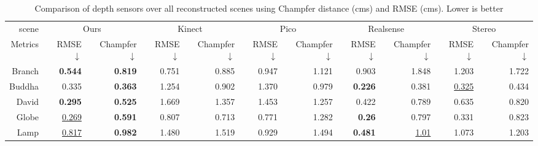 \begin{table*}[t]
    \centering
    \begin{adjustbox}{max width=\linewidth}
    \setlength{\tabcolsep}{4pt}
    {\small
        \begin{tabular}{rrrrrrrrrrr}
        \toprule
        scene  &  \multicolumn{2}{c}{Ours}  &  \multicolumn{2}{c}{Kinect}  &   \multicolumn{2}{c}{Pico}  &  \multicolumn{2}{c}{Realsense}  &   \multicolumn{2}{c}{Stereo}  \\
         Metrics   &  RMSE $\downarrow$ & Champfer $\downarrow$ &  RMSE $\downarrow$ & Champfer $\downarrow$ &  RMSE $\downarrow$ & Champfer $\downarrow$ &  RMSE $\downarrow$ & Champfer $\downarrow$ &  RMSE $\downarrow$ & Champfer $\downarrow$ \\
        \midrule
            Branch &  \textbf{0.544} &\textbf{0.819} &   0.751& 0.885 & 0.947 & 1.121 &             0.903 &  1.848&             1.203 &             1.722 \\
            Buddha & 0.335 & \textbf{0.363} & 1.254 & 0.902  & 1.370 & 0.979 &    \textbf{0.226} & 0.381  & \underline{0.325} &0.434 \\
            David &    \textbf{0.295} & \textbf{0.525} & 1.669 & 1.357 & 1.453 & 1.257 & 0.422& 0.789 & 0.635 & 0.820 \\
            Globe &\underline{0.269}& \textbf{0.591} & 0.807 & 0.713 & 0.771 & 1.282 & \textbf{0.26} & 0.797 & 0.331 & 0.823 \\
            Lamp &\underline{0.817} &  \textbf{0.982} &   1.480 &  1.519& 0.929  & 1.494 & \textbf{0.481} & \underline{1.01}  & 1.073 & 1.203 \\
        \bottomrule
        \end{tabular}    
    }
    \end{adjustbox}
\caption{Comparison of depth sensors over all reconstructed scenes using Champfer distance (cms) and RMSE (cms). Lower is better}
\label{tab:depthTable}
\end{table*}
